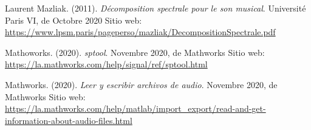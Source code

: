 \documentclass[conference,onecolumn]{IEEEtran}
\begin{document}
\begin{flushleft}
\begin{thebibliography}{100}
Laurent Mazliak. (2011).
\textit{Décomposition spectrale pour le son musical}. Université Paris VI, de Octobre 2020 Sitio web: \href{https://www.lpsm.paris/pageperso/mazliak/DecompositionSpectrale.pdf}{https://www.lpsm.paris/pageperso/mazliak/DecompositionSpectrale.pdf}

Mathoworks. (2020).
\textit{sptool}. Novembre 2020, de Mathworks Sitio web: \href{https://la.mathworks.com/help/signal/ref/sptool.html}{https://la.mathworks.com/help/signal/ref/sptool.html}

Mathworks. (2020).
\textit{Leer y escribir archivos de audio}. Novembre 2020, de Mathworks Sitio web: \href{https://la.mathworks.com/help/matlab/import_export/read-and-get-information-about-audio-files.html}{https://la.mathworks.com/help/matlab/import\_export/read-and-get-information-about-audio-files.html}

\end{thebibliography}
\end{flushleft}
\end{document}
